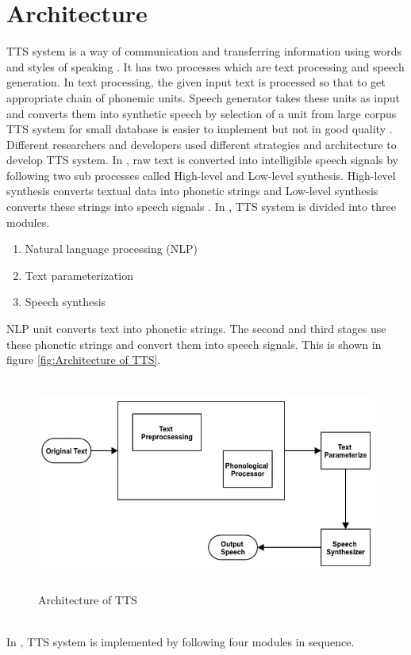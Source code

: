 \section{Architecture}
TTS system is a way of communication and transferring information using words and styles of speaking \cite{eide2004corpus}. It has two processes which are text processing and speech generation. In text processing, the given input text is processed so that to get appropriate chain of phonemic units. Speech generator takes these units as input and converts them into synthetic speech by selection of a unit from large corpus TTS system for small database is easier to implement but not in good quality \cite{black2007statistical, zen2007hmm, raj2007text}. Different researchers and developers used different strategies and architecture to develop TTS system. In \cite{kabir2002natural}, raw text is converted into intelligible speech signals by following two sub processes called High-level and Low-level synthesis. High-level synthesis converts textual data into phonetic strings and Low-level synthesis converts these strings into speech signals \cite{kabir2002natural}. In \cite{hussain2005phonological}, TTS system is divided into three modules.

\begin{enumerate}
  \item Natural language processing (NLP)
  \item Text parameterization
  \item Speech synthesis
\end{enumerate}

NLP unit converts text into phonetic strings. The second and third stages use these phonetic strings and convert them into speech signals. This is shown in figure \ref{fig:Architecture of TTS}.

\begin{figure}
  \centering
  \includegraphics[width=\linewidth, height=7cm,keepaspectratio]{images/tts_block_dg.jpg}
  \caption{Architecture of TTS}
  \label{fig:Text to speech synthesis system architecture}
\end{figure}
\\
In \cite{liberman1992text}, TTS system is implemented by following four modules in sequence.


